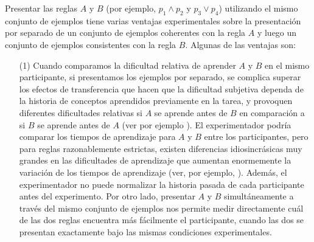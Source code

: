 Presentar las reglas $A$ y $B$ (por ejemplo, $p_1\land p_2$ y $p_3 \lor p_4$) utilizando el mismo conjunto de ejemplos tiene varias ventajas experimentales sobre la presentación por separado de un conjunto de ejemplos coherentes con la regla $A$ y luego un conjunto de ejemplos consistentes con la regla $B$. Algunas de las ventajas son:

\begin{enumerate}
\item [(1)] 
Cuando comparamos la dificultad relativa de aprender $A$ y $B$ en el mismo participante, si presentamos los ejemplos por separado, se complica superar los efectos de transferencia que hacen que la dificultad subjetiva dependa de la historia de conceptos aprendidos previamente en la tarea, y provoquen diferentes dificultades relativas si $A$ se aprende antes de $B$ en comparación a si $B$ se aprende antes de $A$ (ver por ejemplo \cite{tano2020towards}). El experimentador podría comparar los tiempos de aprendizaje para $A$ y $B$ entre los participantes, pero para reglas razonablemente estrictas, existen diferencias idiosincrásicas muy grandes en las dificultades de aprendizaje que aumentan enormemente la variación de los tiempos de aprendizaje (ver, por ejemplo, \cite{feldman2000minimization}). Además, el experimentador no puede normalizar la historia pasada de cada participante antes del experimento. Por otro lado, presentar $A$ y $B$ simultáneamente a través del mismo conjunto de ejemplos nos permite medir directamente cuál de las dos reglas encuentra más fácilmente el participante, cuando las dos se presentan exactamente bajo las mismas condiciones experimentales.


\end{enumerate}
